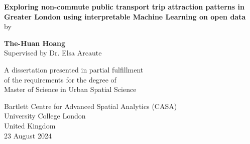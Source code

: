 
 \begin{titlepage}
    \begin{center}
        \vspace*{-3cm}
        
        \vfill %
        
        {\LARGE\textbf{Exploring non-commute public transport trip attraction patterns in Greater London using interpretable Machine Learning on open data\\}}    
        \vspace{2cm}
        by\\
        \vspace{1cm}
    
        {\LARGE\textbf{The-Huan Hoang\\}}
        \vspace{0.5cm}
        Supervised by Dr. Elsa Arcaute\\
    
        \vfill
             
        A dissertation presented in partial fulfillment \\
        of the requirements for the degree of\\
        Master of Science in Urban Spatial Science
             
        \vspace{1cm}
                 
        Bartlett Centre for Advanced Spatial Analytics (CASA) \\
        University College London\\
        United Kingdom\\
        23 August 2024
    
    \end{center}
\end{titlepage}
